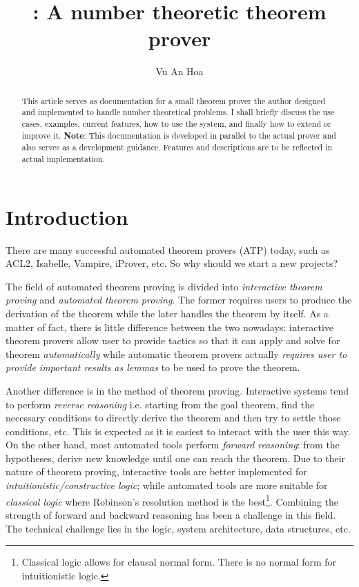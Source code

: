 \documentclass[12pt]{article}
\title{\zetatp: A number theoretic theorem prover}
\author{Vu An Hoa}
\begin{document}
\maketitle

\begin{abstract}
This article serves as documentation for a small theorem prover the author designed and implemented to handle number theoretical problems. I shall briefly discuss the use cases, examples, current features, how to use the system, and finally how to extend or improve it. {\bf Note}: This documentation is developed in parallel to the actual prover and also serves as a development guidance. Features and descriptions are to be reflected in actual implementation.
\end{abstract}

\section{Introduction}

There are many successful automated theorem provers (ATP) today, such as ACL2, Isabelle, Vampire, iProver, etc. So why should we start a new projects?

The field of automated theorem proving is divided into \emph{interactive theorem proving} and \emph{automated theorem proving}. The former requires users to produce the derivation of the theorem while the later handles the theorem by itself. As a matter of fact, there is little difference between the two nowadays: interactive theorem provers allow user to provide tactics so that it can apply and solve for theorem \emph{automatically} while automatic theorem provers actually \emph{requires user to provide important results as lemmas} to be used to prove the theorem. 

Another difference is in the method of theorem proving. Interactive systems tend to perform \emph{reverse reasoning} i.e. starting from the goal theorem, find the necessary conditions to directly derive the theorem and then try to settle those conditions, etc. This is expected as it is easiest to interact with the user this way. On the other hand, most automated tools perform \emph{forward reasoning}: from the hypotheses, derive new knowledge until one can reach the theorem. Due to their nature of theorem proving, interactive tools are better implemented for \emph{intuitionistic/constructive logic}; while automated tools are more suitable for \emph{classical logic} where Robinson's resolution method is the best\footnote{Classical logic allows for clausal normal form. There is no normal form for intuitionistic logic.}. Combining the strength of forward and backward reasoning has been a challenge in this field. The technical challenge lies in the logic, system architecture, data structures, etc.
\end{document}
